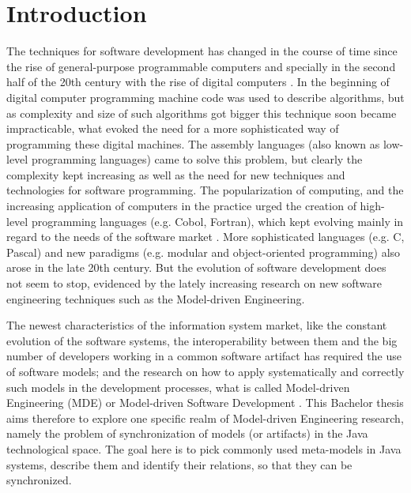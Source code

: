 \documentclass[tuberlin,cic,tc,english,noabntcite]{iiufrgs}
\begin{document}
\tableofcontents

\chapter{Introduction}
The techniques for software development has changed in the course of time since the rise of general-purpose programmable computers and specially in the second half of the 20th century with the rise of digital computers \citep{ceruzzi2003history}. In the beginning of digital computer programming machine code was used to describe algorithms, but as complexity and size of such algorithms got bigger this technique soon became impracticable, what evoked the need for a more sophisticated way of programming these digital machines. The assembly languages (also known as low-level programming languages) came to solve this problem, but clearly the complexity kept increasing as well as the need for new techniques and technologies for software programming. The popularization of computing, and the increasing application of computers in the practice urged the creation of high-level programming languages (e.g. Cobol, Fortran), which kept evolving mainly in regard to the needs of the software market \citep{ceruzzi2003history}. More sophisticated languages (e.g. C, Pascal) and new paradigms (e.g. modular and object-oriented programming) also arose in the late 20th century. But the evolution of software development does not seem to stop, evidenced by the lately increasing research on new software engineering techniques such as the Model-driven Engineering.

The newest characteristics of the information system market, like the constant evolution of the software systems, the interoperability between them and the big number of developers working in a common software artifact has required the use of software models; and the research on how to apply systematically and correctly such models in the development processes, what is called Model-driven Engineering (MDE) or Model-driven Software Development \cite{france2007model}. This Bachelor thesis aims therefore to explore one specific realm of Model-driven Engineering research, namely the problem of synchronization of models (or artifacts) in the Java technological space. The goal here is to pick commonly used meta-models in Java systems, describe them and identify their relations, so that they can be synchronized.
\end{document}
